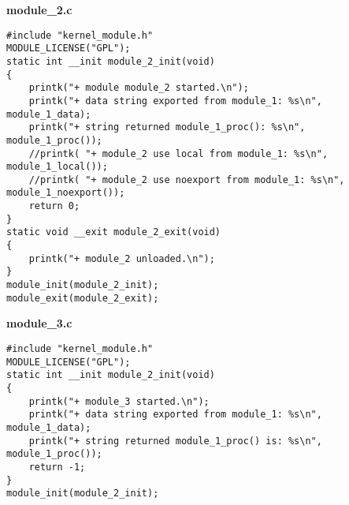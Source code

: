 \textbf{module\_2.c}
\begin{lstlisting}
#include "kernel_module.h"
MODULE_LICENSE("GPL");
static int __init module_2_init(void)
{
    printk("+ module module_2 started.\n");
    printk("+ data string exported from module_1: %s\n", module_1_data);
    printk("+ string returned module_1_proc(): %s\n", module_1_proc());
    //printk( "+ module_2 use local from module_1: %s\n", module_1_local());
    //printk( "+ module_2 use noexport from module_1: %s\n", module_1_noexport());
    return 0;
}
static void __exit module_2_exit(void)
{
    printk("+ module_2 unloaded.\n");
}
module_init(module_2_init);
module_exit(module_2_exit);
\end{lstlisting}

\textbf{module\_3.c}
\begin{lstlisting}
#include "kernel_module.h"
MODULE_LICENSE("GPL");
static int __init module_2_init(void)
{
    printk("+ module_3 started.\n");
    printk("+ data string exported from module_1: %s\n", module_1_data);
    printk("+ string returned module_1_proc() is: %s\n", module_1_proc());
    return -1;
}
module_init(module_2_init);
\end{lstlisting}